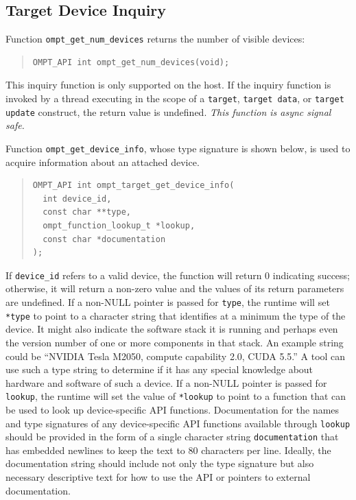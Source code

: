 \documentclass{article}
\begin{document}
\subsection{Target Device Inquiry}
\label{sec:target-region}
Function \verb|ompt_get_num_devices| returns the number of visible devices:
\begin{quote}
\begin{verbatim}
OMPT_API int ompt_get_num_devices(void);
\end{verbatim}
\end{quote}
This inquiry function is only supported on the host. If the inquiry function is invoked by a thread executing in the scope of a {\tt target}, {\tt target data}, or {\tt target update} construct, the return value is undefined. {\it This function is async signal safe.}

Function \verb|ompt_get_device_info|, whose type signature is shown below, is used to acquire information about an attached device. 
\begin{quote}
\begin{verbatim}
OMPT_API int ompt_target_get_device_info(
  int device_id, 
  const char **type, 
  ompt_function_lookup_t *lookup,
  const char *documentation
);
\end{verbatim}
\end{quote}
If \verb|device_id| refers to a valid device, the function will return 0 indicating success; otherwise, it will return a non-zero value and the values of its return parameters are undefined. If a non-NULL pointer is passed for \verb|type|, the runtime will set \verb|*type| to point to a character string that identifies at a minimum the  type of the device. It might also indicate the software stack it is running and perhaps even the version number of one or more components in that stack. An example string could be ``NVIDIA Tesla M2050, compute capability 2.0, CUDA 5.5.'' A tool can use such a type string to determine if it has any special knowledge about hardware and software of such a device. If a non-NULL pointer is passed for \verb|lookup|, the runtime will set the value of \verb|*lookup| to point to a function that can be used to look up device-specific API functions.  Documentation for the names and type signatures of any device-specific API functions available through \verb|lookup| should be provided in the form of a single character string \verb|documentation| that has embedded newlines to keep the text to 80 characters per line. Ideally, the documentation string should include not only the type signature but also necessary descriptive text for how to use the API or pointers to external documentation.
\end{document}
